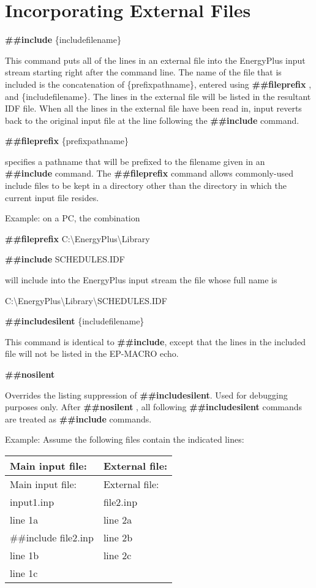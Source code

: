 \section{Incorporating External Files}\label{incorporating-external-files}

\textbf{\#\#include} \{includefilename\}

This command puts all of the lines in an external file into the EnergyPlus input stream starting right after the command line. The name of the file that is included is the concatenation of \{prefixpathname\}, entered using \textbf{\#\#fileprefix} , and \{includefilename\}. The lines in the external file will be listed in the resultant IDF file. When all the lines in the external file have been read in, input reverts back to the original input file at the line following the \textbf{\#\#include} command.

\textbf{\#\#fileprefix} \{prefixpathname\}

specifies a pathname that will be prefixed to the filename given in an \textbf{\#\#include} command. The \textbf{\#\#fileprefix} command allows commonly-used include files to be kept in a directory other than the directory in which the current input file resides.

Example: on a PC, the combination

\textbf{\#\#fileprefix} C:\textbackslash{}EnergyPlus\textbackslash{}Library

\textbf{\#\#include} SCHEDULES.IDF

will include into the EnergyPlus input stream the file whose full name is

C:\textbackslash{}EnergyPlus\textbackslash{}Library\textbackslash{}SCHEDULES.IDF

\textbf{\#\#includesilent} \{includefilename\}

This command is identical to \textbf{\#\#include}, except that the lines in the included file will not be listed in the EP-MACRO echo.

\textbf{\#\#nosilent}

Overrides the listing suppression of \textbf{\#\#includesilent}. Used for debugging purposes only. After \textbf{\#\#nosilent} , all following \textbf{\#\#includesilent} commands are treated as \textbf{\#\#include} commands.

Example: Assume the following files contain the indicated lines:

\begin{longtable}[c]{@{}ll@{}}
\toprule 
Main input file: & External file: \tabularnewline
\midrule
\endfirsthead

\toprule 
Main input file: & External file: \tabularnewline
\midrule
\endhead

input1.inp & file2.inp \tabularnewline
line 1a & line 2a \tabularnewline
\#\#include file2.inp & line 2b \tabularnewline
line 1b & line 2c \tabularnewline
line 1c &  \tabularnewline
\bottomrule
\end{longtable}

